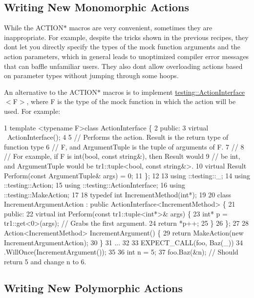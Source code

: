 \subsection*{Writing New Monomorphic Actions}

While the {\ttfamily A\+C\+T\+I\+O\+N$\ast$} macros are very convenient, sometimes they are inappropriate. For example, despite the tricks shown in the previous recipes, they don\textquotesingle{}t let you directly specify the types of the mock function arguments and the action parameters, which in general leads to unoptimized compiler error messages that can baffle unfamiliar users. They also don\textquotesingle{}t allow overloading actions based on parameter types without jumping through some hoops.

An alternative to the {\ttfamily A\+C\+T\+I\+O\+N$\ast$} macros is to implement {\ttfamily \hyperlink{classtesting_1_1ActionInterface}{testing\+::\+Action\+Interface}$<$F$>$}, where {\ttfamily F} is the type of the mock function in which the action will be used. For example\+:


\begin{DoxyCode}
1 template <typename F>class ActionInterface \{
2  public:
3   virtual ~ActionInterface();
4 
5   // Performs the action.  Result is the return type of function type
6   // F, and ArgumentTuple is the tuple of arguments of F.
7   //
8   // For example, if F is int(bool, const string&), then Result would
9   // be int, and ArgumentTuple would be tr1::tuple<bool, const string&>.
10   virtual Result Perform(const ArgumentTuple& args) = 0;
11 \};
12 
13 using ::testing::\_;
14 using ::testing::Action;
15 using ::testing::ActionInterface;
16 using ::testing::MakeAction;
17 
18 typedef int IncrementMethod(int*);
19 
20 class IncrementArgumentAction : public ActionInterface<IncrementMethod> \{
21  public:
22   virtual int Perform(const tr1::tuple<int*>& args) \{
23     int* p = tr1::get<0>(args);  // Grabs the first argument.
24     return *p++;
25   \}
26 \};
27 
28 Action<IncrementMethod> IncrementArgument() \{
29   return MakeAction(new IncrementArgumentAction);
30 \}
31 ...
32 
33   EXPECT\_CALL(foo, Baz(\_))
34       .WillOnce(IncrementArgument());
35 
36   int n = 5;
37   foo.Baz(&n);  // Should return 5 and change n to 6.
\end{DoxyCode}


\subsection*{Writing New Polymorphic Actions}

